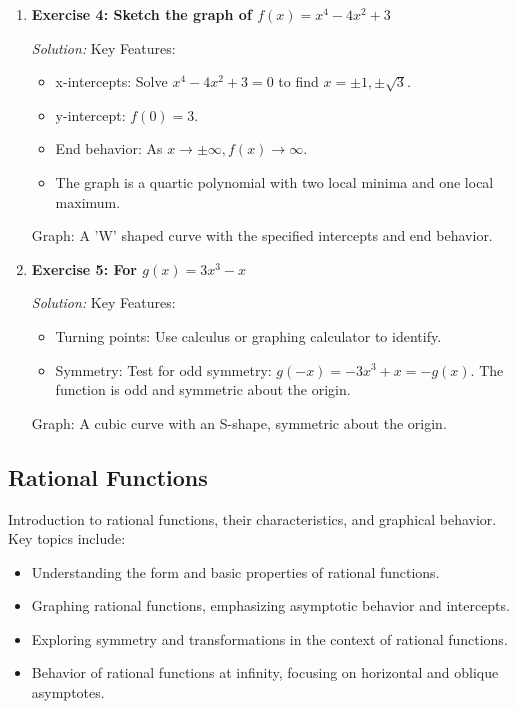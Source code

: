 \documentclass[a4paper,12pt]{book}
\newenvironment{solution}[1][]
{\par\noindent\textit{Solution:} \rmfamily}{\medskip}
\begin{document}
\begin{enumerate}
    \item \textbf{Exercise 4: Sketch the graph of \( f(x) = x^4 - 4x^2 + 3 \)}
    \begin{solution}
    Key Features:
    \begin{itemize}
        \item x-intercepts: Solve \( x^4 - 4x^2 + 3 = 0 \) to find \( x = \pm 1, \pm \sqrt{3} \).
        \item y-intercept: \( f(0) = 3 \).
        \item End behavior: As \( x \rightarrow \pm \infty, f(x) \rightarrow \infty \).
        \item The graph is a quartic polynomial with two local minima and one local maximum.
    \end{itemize}
    Graph: A 'W' shaped curve with the specified intercepts and end behavior.
    \end{solution}

    \item \textbf{Exercise 5: For \( g(x) = 3x^3 - x \)}
    \begin{solution}
    Key Features:
    \begin{itemize}
        \item Turning points: Use calculus or graphing calculator to identify.
        \item Symmetry: Test for odd symmetry: \( g(-x) = -3x^3 + x = -g(x) \). The function is odd and symmetric about the origin.
    \end{itemize}
    Graph: A cubic curve with an S-shape, symmetric about the origin.
    \end{solution}
\end{enumerate}


\subsection{Rational Functions}
\label{subsec:rational_functions}
Introduction to rational functions, their characteristics, and graphical behavior. Key topics include:

\begin{itemize}
    \item Understanding the form and basic properties of rational functions.
    \item Graphing rational functions, emphasizing asymptotic behavior and intercepts.
    \item Exploring symmetry and transformations in the context of rational functions.
    \item Behavior of rational functions at infinity, focusing on horizontal and oblique asymptotes.
\end{itemize}
\end{document}
